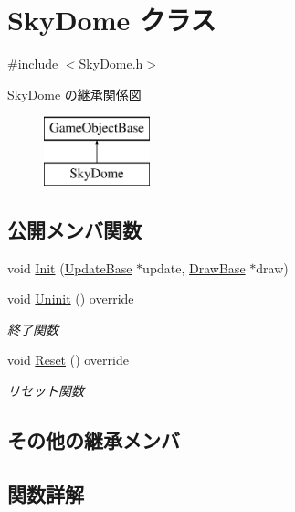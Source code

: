 \hypertarget{class_sky_dome}{}\section{Sky\+Dome クラス}
\label{class_sky_dome}


{\ttfamily \#include $<$Sky\+Dome.\+h$>$}

Sky\+Dome の継承関係図\begin{figure}[H]
\begin{center}
\leavevmode
\includegraphics[height=2.000000cm]{class_sky_dome}
\end{center}
\end{figure}
\subsection*{公開メンバ関数}
\begin{DoxyCompactItemize}
\item 
void \mbox{\hyperlink{class_sky_dome_a948e0e90cea46c78053ac55610812d6c}{Init}} (\mbox{\hyperlink{class_update_base}{Update\+Base}} $\ast$update, \mbox{\hyperlink{class_draw_base}{Draw\+Base}} $\ast$draw)
\item 
void \mbox{\hyperlink{class_sky_dome_a7fc71bfa671cf6e7ab26a194459b0753}{Uninit}} () override
\begin{DoxyCompactList}\small\item\em 終了関数 \end{DoxyCompactList}\item 
void \mbox{\hyperlink{class_sky_dome_abc6f8ed1471d7b03f25924a849cae590}{Reset}} () override
\begin{DoxyCompactList}\small\item\em リセット関数 \end{DoxyCompactList}\end{DoxyCompactItemize}
\subsection*{その他の継承メンバ}


\subsection{関数詳解}
\mbox{\label{class_sky_dome_a948e0e90cea46c78053ac55610812d6c}} 
